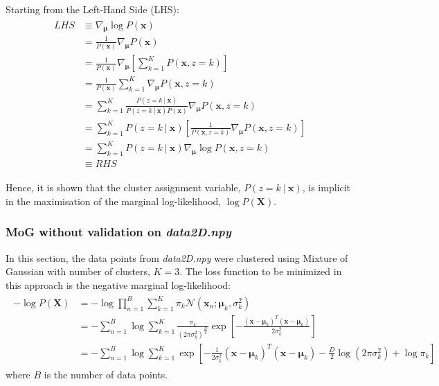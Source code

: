 \documentclass[a4paper,12pt]{article}
\newcommand{\given}{\ | \ }
\newcommand{\x}{\mathbf{x}}
\newcommand{\X}{\mathbf{X}}
\newcommand{\means}{\bm{\mu}}
\newcommand{\gradmu}{\nabla_{\bm{\mu}}}
\begin{document}
Starting from the Left-Hand Side (LHS):
\begin{align}
\begin{split}
LHS & \equiv \gradmu \log P(\x) \\
& = \frac{1}{P(\x)} \gradmu P(\x) \\
& = \frac{1}{P(\x)} \gradmu \left[ \sum_{k=1}^K P(\x, z = k) \right] \\
& = \frac{1}{P(\x)} \sum_{k=1}^K \gradmu P(\x, z = k) \\
& = \sum_{k=1}^K \frac{P(z = k \given \x)}{P(z = k \given \x) P(\x)} \gradmu P(\x, z = k) \\
& = \sum_{k=1}^K P(z = k \given \x) \left[ \frac{1}{P(\x, z = k)} \gradmu P(\x, z = k) \right] \\
& = \sum_{k=1}^K P(z = k \given \x) \gradmu \log P(\x, z = k) \\
& \equiv RHS
\end{split}
\end{align}

Hence, it is shown that the cluster assignment variable, $P(z = k \given \x)$, is implicit in the maximisation of the marginal log-likelihood, $\log P(\X)$.

\clearpage
\subsubsection{MoG without validation on \textit{data2D.npy}}
In this section, the data points from \textit{data2D.npy} were clustered using Mixture of Gaussian with number of clusters, $K = 3$. The loss function to be minimized in this approach is the negative marginal log-likelihood:
\begin{align}
\begin{split}
- \log P(\X) & = - \log \prod_{n=1}^B \sum_{k=1}^K \pi_k \mathcal{N}(\x_n; \bm{\mu}_k, \sigma_k^2) \\
& = - \sum_{n=1}^B \log \sum_{k=1}^K \frac{\pi_k}{(2 \pi \sigma_k^2)^{\frac{D}{2}}} \exp \left[ -\frac{(\x - \means_k)^T(\x - \means_k)}{2 \sigma_k^2} \right] \\
& = - \sum_{n=1}^B \log \sum_{k=1}^K \exp \left[ - \frac{1}{2 \sigma_k^2} (\x - \means_k)^T (\x - \means_k) - \frac{D}{2} \log (2 \pi \sigma_k^2) + \log \pi_k \right]
\end{split}
\end{align}
where $B$ is the number of data points. \\
\end{document}

